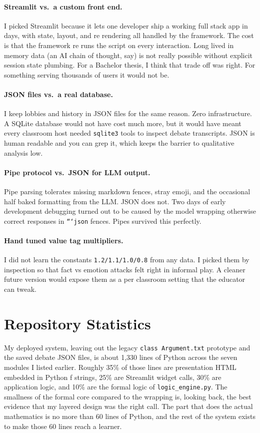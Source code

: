 \paragraph{Streamlit vs.~a custom front end.} I picked Streamlit because it lets one developer ship a working full stack app in days, with state, layout, and re rendering all handled by the framework. The cost is that the framework re runs the script on every interaction. Long lived in memory data (an AI chain of thought, say) is not really possible without explicit session state plumbing. For a Bachelor thesis, I think that trade off was right. For something serving thousands of users it would not be.

\paragraph{JSON files vs.~a real database.} I keep lobbies and history in JSON files for the same reason. Zero infrastructure. A SQLite database would not have cost much more, but it would have meant every classroom host needed \texttt{sqlite3} tools to inspect debate transcripts. JSON is human readable and you can grep it, which keeps the barrier to qualitative analysis low.

\paragraph{Pipe protocol vs.~JSON for LLM output.} Pipe parsing tolerates missing markdown fences, stray emoji, and the occasional half baked formatting from the LLM. JSON does not. Two days of early development debugging turned out to be caused by the model wrapping otherwise correct responses in \texttt{```json} fences. Pipes survived this perfectly.

\paragraph{Hand tuned value tag multipliers.} I did not learn the constants \texttt{1.2/1.1/1.0/0.8} from any data. I picked them by inspection so that fact vs emotion attacks felt right in informal play. A cleaner future version would expose them as a per classroom setting that the educator can tweak.

\section{Repository Statistics}
My deployed system, leaving out the legacy \texttt{class~Argument.txt} prototype and the saved debate JSON files, is about 1{,}330 lines of Python across the seven modules I listed earlier. Roughly 35\% of those lines are presentation HTML embedded in Python f strings, 25\% are Streamlit widget calls, 30\% are application logic, and 10\% are the formal logic of \texttt{logic\_engine.py}. The smallness of the formal core compared to the wrapping is, looking back, the best evidence that my layered design was the right call. The part that does the actual mathematics is no more than 60 lines of Python, and the rest of the system exists to make those 60 lines reach a learner.

